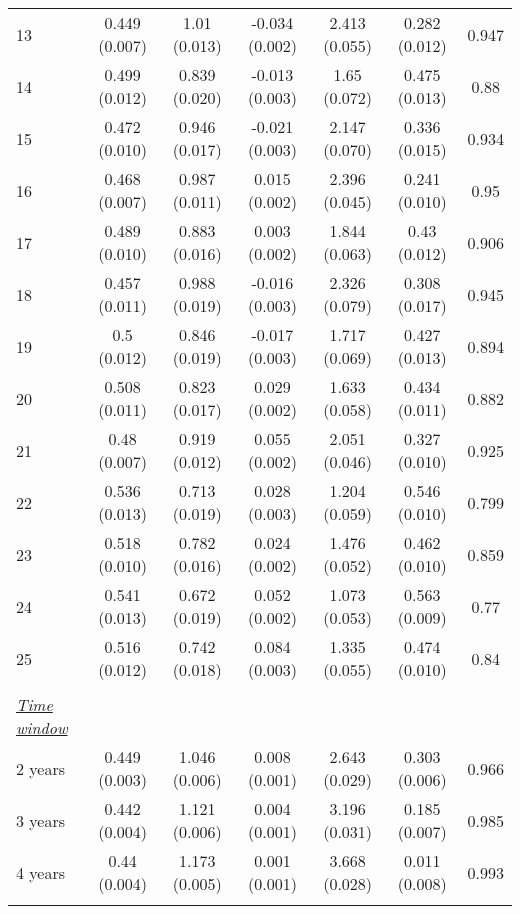 \begin{tabular}{@{\extracolsep{5pt}} l cccccc}
13 & 0.449 (0.007) & 1.01 (0.013) & -0.034 (0.002) & 2.413 (0.055) & 0.282 (0.012) & 0.947 \\ 
14 & 0.499 (0.012) & 0.839 (0.020) & -0.013 (0.003) & 1.65 (0.072) & 0.475 (0.013) & 0.88 \\ 
15 & 0.472 (0.010) & 0.946 (0.017) & -0.021 (0.003) & 2.147 (0.070) & 0.336 (0.015) & 0.934 \\ 
16 & 0.468 (0.007) & 0.987 (0.011) & 0.015 (0.002) & 2.396 (0.045) & 0.241 (0.010) & 0.95 \\ 
17 & 0.489 (0.010) & 0.883 (0.016) & 0.003 (0.002) & 1.844 (0.063) & 0.43 (0.012) & 0.906 \\ 
18 & 0.457 (0.011) & 0.988 (0.019) & -0.016 (0.003) & 2.326 (0.079) & 0.308 (0.017) & 0.945 \\ 
19 & 0.5 (0.012) & 0.846 (0.019) & -0.017 (0.003) & 1.717 (0.069) & 0.427 (0.013) & 0.894 \\ 
20 & 0.508 (0.011) & 0.823 (0.017) & 0.029 (0.002) & 1.633 (0.058) & 0.434 (0.011) & 0.882 \\ 
21 & 0.48 (0.007) & 0.919 (0.012) & 0.055 (0.002) & 2.051 (0.046) & 0.327 (0.010) & 0.925 \\ 
22 & 0.536 (0.013) & 0.713 (0.019) & 0.028 (0.003) & 1.204 (0.059) & 0.546 (0.010) & 0.799 \\ 
23 & 0.518 (0.010) & 0.782 (0.016) & 0.024 (0.002) & 1.476 (0.052) & 0.462 (0.010) & 0.859 \\ 
24 & 0.541 (0.013) & 0.672 (0.019) & 0.052 (0.002) & 1.073 (0.053) & 0.563 (0.009) & 0.77 \\ 
25 & 0.516 (0.012) & 0.742 (0.018) & 0.084 (0.003) & 1.335 (0.055) & 0.474 (0.010) & 0.84 \\ 
 &   &   &   &   &   &  \\ 
\underline{{\it Time window}} &   &   &   &   &   &  \\ 
2 years & 0.449 (0.003) & 1.046 (0.006) & 0.008 (0.001) & 2.643 (0.029) & 0.303 (0.006) & 0.966 \\ 
3 years & 0.442 (0.004) & 1.121 (0.006) & 0.004 (0.001) & 3.196 (0.031) & 0.185 (0.007) & 0.985 \\ 
4 years & 0.44 (0.004) & 1.173 (0.005) & 0.001 (0.001) & 3.668 (0.028) & 0.011 (0.008) & 0.993 \\ 
\hline \\[-1.8ex] 
\end{tabular} 
